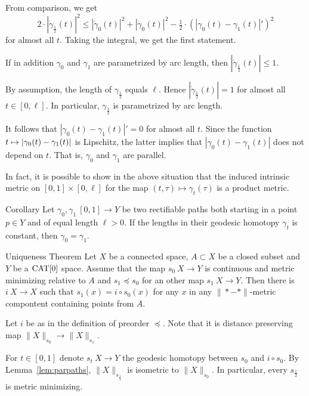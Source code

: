 \documentclass{article}
\begin{document}
From comparison, we get
\[2\cdot|\dot\gamma_{\frac12}(t)|^2
\le
|\dot\gamma_{0}(t)|^2
+|\dot\gamma_{0}(t)|^2
-\tfrac12\cdot(|\gamma_{0}(t)-\gamma_{1}(t)|')^2\] 
for almost all $t$.
Taking the integral, we get the first statement.

If in addition $\gamma_0$ and $\gamma_1$ are parametrized by arc length, 
then $|\dot\gamma_{\frac12}(t)|\le 1$.

By assumption, the length of $\gamma_{\frac12}$ equals $\ell$. 
Hence $|\dot\gamma_{\frac12}(t)|=1$ for almost all $t\in[0,\ell]$. 
In particular, $\gamma_{\frac12}$
is parametrized by arc length. 

It follows that $|\gamma_{0}(t)-\gamma_{1}(t)|'=0$ for almost all $t$.
Since the function $t\zz\mapsto |\gamma_{0}(t)-\gamma_{1}(t)|$ is Lipschitz,
the latter  implies that $|\gamma_{0}(t)-\gamma_{1}(t)|$ does not depend on $t$.
That is, $\gamma_{0}$ and $\gamma_{1}$ are parallel.
\qeds

In fact, it is possible to show in the above situation that the induced intrinsic metric on $[0,1]\times[0,\ell]$
for the map $(t,\tau)\mapsto \gamma_t(\tau)$ is a product metric.

\begin{thm}{Corollary}\label{cor:parpaths}
Let $\gamma_0,\gamma_1\:[0,1]\to Y$ be two rectifiable paths both starting in a point $p\in Y$ and of equal length $\ell>0$. 
If the lengths in their geodesic homotopy $\gamma_t$ is constant, then $\gamma_{0}=\gamma_{1}$.
\end{thm}

\begin{thm}{Uniqueness Theorem}\label{prop:strict-mm}
Let $X$ be a connected space, 
$A\subset X$ be a closed subset 
and $Y$ be a $\mathop{\rm CAT}\nolimits[0]$ space.
Assume that the map $s_0\:X\to Y$ is continuous and metric minimizing relative to $A$ and 
$s_1\preccurlyeq s_0$ for an other map $s_1\:X\to Y$.
Then there is $i\:X\to X$ such that $s_1(x)=i\circ s_0(x)$ for any $x$ in any $\|{*}-{*}\|$-metric compontent containing points from $A$.
\end{thm}

Let $i$ be as in the definition of preorder  $\preccurlyeq$.
Note that it is distance preserving map $\|X\|_{s_0}\to \|X\|_{s_1}$.

For $t\in[0,1]$ denote $s_t\:X\to Y$ the geodesic homotopy between $s_0$ and $i\circ s_0$. 
By Lemma~\ref{lem:parpaths},  $\|X\|_{s_{\frac12}}$ is isometric to $\|X\|_{s_0}$. 
In particular, every $s_{\frac12}$ is metric minimizing.
\end{document}
